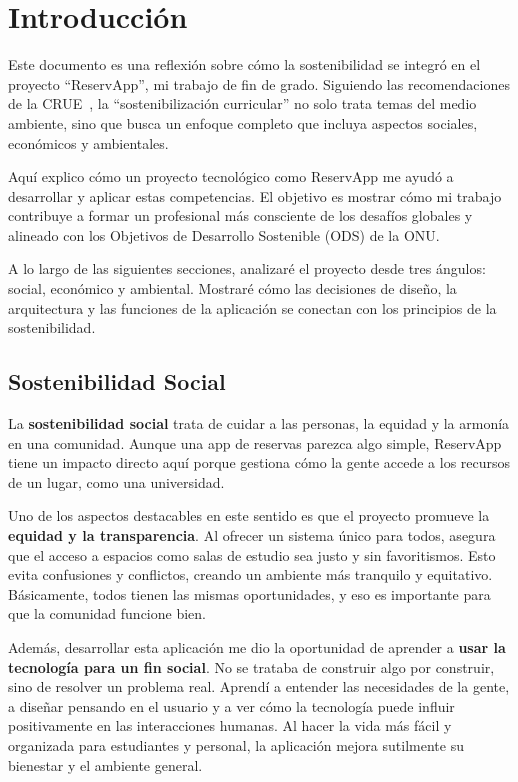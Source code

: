 
\section{Introducción}
Este documento es una reflexión sobre cómo la sostenibilidad se integró en el proyecto ``ReservApp'', mi trabajo de fin de grado. Siguiendo las recomendaciones de la CRUE~\cite{crue}, la ``sostenibilización curricular'' no solo trata temas del medio ambiente, sino que busca un enfoque completo que incluya aspectos sociales, económicos y ambientales.

Aquí explico cómo un proyecto tecnológico como ReservApp me ayudó a desarrollar y aplicar estas competencias. El objetivo es mostrar cómo mi trabajo contribuye a formar un profesional más consciente de los desafíos globales y alineado con los Objetivos de Desarrollo Sostenible (ODS) de la ONU.

A lo largo de las siguientes secciones, analizaré el proyecto desde tres ángulos: social, económico y ambiental. Mostraré cómo las decisiones de diseño, la arquitectura y las funciones de la aplicación se conectan con los principios de la sostenibilidad.

\subsection{Sostenibilidad Social}
La \textbf{sostenibilidad social} trata de cuidar a las personas, la equidad y la armonía en una comunidad. Aunque una app de reservas parezca algo simple, ReservApp tiene un impacto directo aquí porque gestiona cómo la gente accede a los recursos de un lugar, como una universidad.

Uno de los aspectos destacables en este sentido es que el proyecto promueve la \textbf{equidad y la transparencia}. Al ofrecer un sistema único para todos, asegura que el acceso a espacios como salas de estudio sea justo y sin favoritismos. Esto evita confusiones y conflictos, creando un ambiente más tranquilo y equitativo. Básicamente, todos tienen las mismas oportunidades, y eso es importante para que la comunidad funcione bien.

Además, desarrollar esta aplicación me dio la oportunidad de aprender a \textbf{usar la tecnología para un fin social}. No se trataba de construir algo por construir, sino de resolver un problema real. Aprendí a entender las necesidades de la gente, a diseñar pensando en el usuario y a ver cómo la tecnología puede influir positivamente en las interacciones humanas. Al hacer la vida más fácil y organizada para estudiantes y personal, la aplicación mejora sutilmente su bienestar y el ambiente general.

